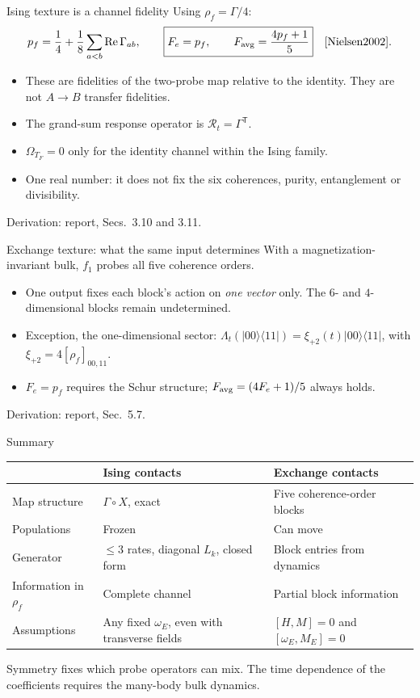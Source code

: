 \documentclass[aspectratio=169,11pt]{beamer}
\newcommand{\ket}[1]{\lvert #1\rangle}
\newcommand{\bra}[1]{\langle #1\rvert}
\newcommand{\report}[1]{{\color{muted}\footnotesize Derivation: report, #1.}}
\begin{document}
\begin{frame}{Ising texture is a channel fidelity}
Using $\rho_f=\Gamma/4$:
\[
p_f=\frac14+\frac18\sum_{a<b}\operatorname{Re}\Gamma_{ab},\qquad
\boxed{F_e=p_f,\qquad F_{\rm avg}=\frac{4p_f+1}{5}}\quad\text{\cite{Nielsen2002}.}
\]
\begin{itemize}\setlength\itemsep{6pt}
\item These are fidelities of the two-probe map relative to the identity.
They are not $A\to B$ transfer fidelities.
\item The grand-sum response operator is $\mathcal R_t=\Gamma^{\mathsf T}$.
\item $\Omega_{T_F}=0$ only for the identity channel within the Ising family.
\item One real number: it does not fix the six coherences, purity,
entanglement or divisibility.
\end{itemize}
\report{Secs.~3.10 and 3.11}
\end{frame}

\begin{frame}{Exchange texture: what the same input determines}
With a magnetization-invariant bulk, $f_1$ probes all five coherence orders.
\begin{itemize}\setlength\itemsep{7pt}
\item One output fixes each block's action on \emph{one vector} only. The
$6$- and $4$-dimensional blocks remain undetermined.
\item Exception, the one-dimensional sector:
$\Lambda_t(\ket{00}\bra{11})=\xi_{+2}(t)\ket{00}\bra{11}$, with
$\boxed{\xi_{+2}=4[\rho_f]_{00,11}}$.
\item $F_e=p_f$ requires the Schur structure; $F_{\rm avg}=(4F_e+1)/5$
always holds.
\end{itemize}
\report{Sec.~5.7}
\end{frame}

\begin{frame}{Summary}
\begin{center}
\small
\begin{tabular}{@{}p{2.7cm}p{4.9cm}p{5.0cm}@{}}
\toprule
&Ising contacts&Exchange contacts\\\midrule
Map structure&$\Gamma\circ X$, exact&Five coherence-order blocks\\[4pt]
Populations&Frozen&Can move\\[4pt]
Generator&$\le3$ rates, diagonal $L_k$, closed form&Block entries from dynamics\\[4pt]
Information in $\rho_f$&Complete channel&Partial block information\\[4pt]
Assumptions&Any fixed $\omega_E$, even with transverse fields&$[H,M]=0$ and $[\omega_E,M_E]=0$\\\bottomrule
\end{tabular}
\end{center}
\medskip
Symmetry fixes which probe operators can mix. The time dependence of the
coefficients requires the many-body bulk dynamics.
\end{frame}
\end{document}
